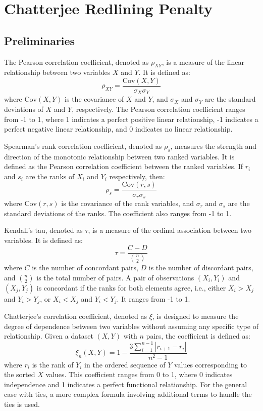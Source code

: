 \chapter{Chatterjee Redlining Penalty}

\section{Preliminaries}

The Pearson correlation coefficient, denoted as $\rho_{XY}$, is a measure of the linear relationship between two variables $X$ and $Y$. It is defined as:
\[
\rho_{XY} = \frac{\mathrm{Cov}(X, Y)}{\sigma_X \sigma_Y}
\]
where $\mathrm{Cov}(X, Y)$ is the covariance of $X$ and $Y$, and $\sigma_X$ and $\sigma_Y$ are the standard deviations of $X$ and $Y$, respectively. The Pearson correlation coefficient ranges from -1 to 1, where 1 indicates a perfect positive linear relationship, -1 indicates a perfect negative linear relationship, and 0 indicates no linear relationship.

Spearman's rank correlation coefficient, denoted as $\rho_s$, measures the strength and direction of the monotonic relationship between two ranked variables. It is defined as the Pearson correlation coefficient between the ranked variables. If $r_i$ and $s_i$ are the ranks of $X_i$ and $Y_i$ respectively, then:
\[
\rho_s = \frac{\mathrm{Cov}(r, s)}{\sigma_r \sigma_s}
\]
where $\mathrm{Cov}(r, s)$ is the covariance of the rank variables, and $\sigma_r$ and $\sigma_s$ are the standard deviations of the ranks. The coefficient also ranges from -1 to 1.

Kendall's tau, denoted as $\tau$, is a measure of the ordinal association between two variables. It is defined as:
\[
\tau = \frac{C - D}{\binom{n}{2}}
\]
where $C$ is the number of concordant pairs, $D$ is the number of discordant pairs, and $\binom{n}{2}$ is the total number of pairs. A pair of observations $(X_i, Y_i)$ and $(X_j, Y_j)$ is concordant if the ranks for both elements agree, i.e., either $X_i > X_j$ and $Y_i > Y_j$, or $X_i < X_j$ and $Y_i < Y_j$. It ranges from -1 to 1.

Chatterjee's correlation coefficient, denoted as $\xi$, is designed to measure the degree of dependence between two variables without assuming any specific type of relationship. Given a dataset $(X, Y)$ with $n$ pairs, the coefficient is defined as:
\[
\xi_n(X,Y) = 1 - \frac{3 \sum_{i=1}^{n-1} |r_{i+1} - r_i|}{n^2 - 1}
\]
where $r_i$ is the rank of $Y_i$ in the ordered sequence of $Y$ values corresponding to the sorted $X$ values. This coefficient ranges from 0 to 1, where 0 indicates independence and 1 indicates a perfect functional relationship. For the general case with ties, a more complex formula involving additional terms to handle the ties is used.


